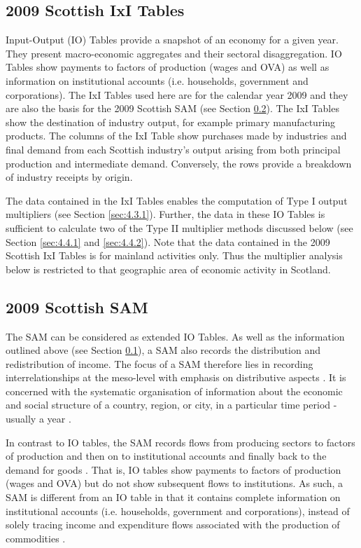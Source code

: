 \begin{doublespacing}
\subsection{2009 Scottish IxI Tables}
\label{sec:4.2.1}

Input-Output (IO) Tables provide a snapshot of an economy for a given year. They present macro-economic aggregates and their sectoral disaggregation. IO Tables show payments to factors of production (wages and OVA) as well as information on institutional accounts (i.e. households, government and corporations). The IxI Tables used here are for the calendar year 2009 and they are also the basis for the 2009 Scottish SAM (see Section \ref{sec:4.2.2}). The IxI Tables show the destination of industry output, for example primary manufacturing products. The columns of the IxI Table show purchases made by industries and final demand from each Scottish industry's output arising from both principal production and intermediate demand. Conversely, the rows provide a breakdown of industry receipts by origin.

\bigskip

The data contained in the IxI Tables enables the computation of Type I output multipliers (see Section \ref{sec:4.3.1}). Further, the data in these IO Tables is sufficient to calculate two of the Type II multiplier methods discussed below (see Section \ref{sec:4.4.1} and \ref{sec:4.4.2}). Note that the data contained in the 2009 Scottish IxI Tables is for mainland activities only. Thus the multiplier analysis below is restricted to that geographic area of economic activity in Scotland.

\subsection{2009 Scottish SAM}
\label{sec:4.2.2}

The SAM can be considered as extended IO Tables. As well as the information outlined above (see Section \ref{sec:4.2.1}), a SAM also records the distribution and redistribution of income. The focus of a SAM therefore lies in recording interrelationships at the meso-level with emphasis on distributive aspects \cite{Keuning1988a}. It is concerned with the systematic organisation of information about the economic and social structure of a country, region, or city, in a particular time period - usually a year \cite{King1981a}.  

\bigskip

In contrast to IO tables, the SAM records flows from producing sectors to factors of production and then on to institutional accounts and finally back to the demand for goods \cite{Adelman1986a}. That is, IO tables show payments to factors of production (wages and OVA) but do not show subsequent flows to institutions. As such, a SAM is different from an IO table in that it contains complete information on institutional accounts (i.e. households, government and corporations), instead of solely tracing income and expenditure flows associated with the production of commodities .


\end{doublespacing}
